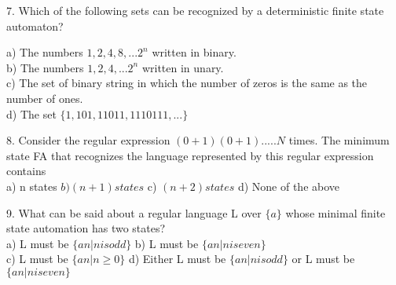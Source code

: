 \documentclass{article}
\begin{document}
\vspace*{0.2cm}
7. Which of the following sets can be recognized by a deterministic finite state automaton?\\

\vspace*{3mm}

\hspace{0.5cm}
a) The numbers $1, 2, 4, 8, . . . 2 ^{n}$ written in binary.\\
\hspace{0.5cm}
b) The numbers $1, 2, 4, . . . 2 ^{n}$ written in unary.\\
\hspace{0.5cm}
c) The set of binary string in which the number of zeros is the same as the number of ones.\\
\hspace{0.5cm}
d) The set $\{1, 101, 11011, 1110111, . . .\}$ \\

\vspace*{3mm}

8. Consider the regular expression $(0 + 1)(0 + 1) . . . . . N$ times. The minimum state FA that recognizes
the language represented by this regular expression contains\\

\vspace*{0.2cm}
\hspace{0.5cm}
a) n states  \hspace*{0.5cm}  $b) (n + 1) states$  \hspace*{0.5cm}   c) $(n + 2) states$  \hspace*{0.5cm}  d) None of the above \\
\vspace*{0.2cm}


9. What can be said about a regular language L over $\{a\}$ whose minimal finite state automation has
two states?\\

\vspace*{0.2cm}
\hspace{0.5cm}
a) L must be $\{an | n is odd\}$     \hspace{0.5cm}   b) L must be $\{an | n is even\}$ \\
\hspace{0.5cm}
c) L must be $\{an | n \geq 0\}$     \hspace{0.5cm}   d) Either L must be $\{an | n is odd\}$ or L must be $\{an | n is even\}$ \\
\vspace*{0.2cm}
\end{document}
